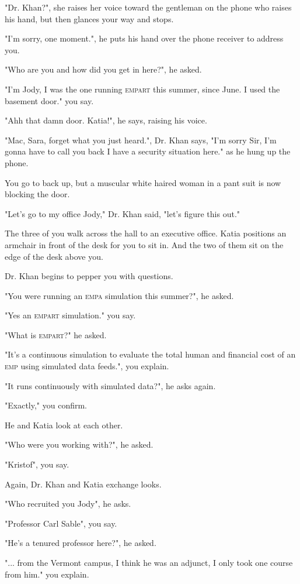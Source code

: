 \documentclass[a5paper, symmetric]{tufte-book}
\begin{document}
"Dr. Khan?", she raises her voice toward the gentleman on the phone who raises his hand, but then glances your way and stops. 

"I'm sorry, one moment.", he puts his hand over the phone receiver to address you. 

"Who are you and how did you get in here?", he asked.

"I'm Jody, I was the one running \textsc{empart} this summer, since June. I used the basement door." you say. 

"Ahh that damn door. Katia!", he says, raising his voice.

"Mac, Sara, forget what you just heard.", Dr. Khan says, "I'm sorry Sir, I'm gonna have to call you back I have a security situation here." as he hung up the phone.

You go to back up, but a muscular white haired woman in a pant suit is now blocking the door.

"Let's go to my office Jody," Dr. Khan said, "let's figure this out." 

The three of you walk across the hall to an executive office. Katia positions an armchair in front of the desk for you to sit in. And the two of them sit on the edge of the desk above you. 

Dr. Khan begins to pepper you with questions. 

"You were running an \textsc{empa} simulation this summer?", he asked. 

"Yes an \textsc{empart} simulation." you say.

"What is \textsc{empart}?" he asked.

"It's a continuous simulation to evaluate the total human and financial cost of an \textsc{emp} using simulated data feeds.", you explain. 

"It runs continuously with simulated data?", he asks again. 

"Exactly," you confirm. 

He and Katia look at each other. 

"Who were you working with?", he asked.

"Kristof", you say.

Again, Dr. Khan and Katia exchange looks. 

"Who recruited you Jody", he asks.

"Professor Carl Sable", you say.

"He's a tenured professor here?", he asked.

"... from the Vermont campus, I think he was an adjunct, I only took one course from him." you explain. 
\end{document}
